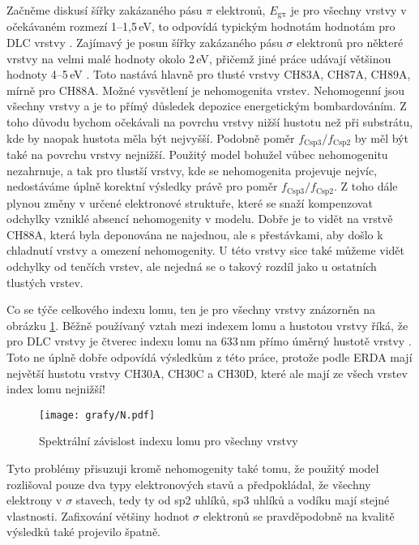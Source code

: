 Začněme diskusí šířky zakázaného pásu $\pi$ elektronů, $E_\mathrm{g\pi}$ je pro všechny vrstvy v očekávaném rozmezí 1--1,5\,eV, to odpovídá typickým hodnotám hodnotám pro DLC vrstvy \cite{Demichelis1992, Franta2007}. 
Zajímavý je posun šířky zakázaného pásu $\sigma$ elektronů pro některé vrstvy na velmi malé hodnoty okolo 2\,eV, přičemž jiné práce udávají většinou hodnoty 4--5\,eV \cite{Demichelis1992, Franta2011}. Toto nastává hlavně pro tlusté vrstvy CH83A, CH87A, CH89A, mírně pro CH88A. Možné vysvětlení je nehomogenita vrstev. Nehomogenní jsou všechny vrstvy a je to přímý důsledek depozice energetickým bombardováním. 
Z toho důvodu bychom očekávali na povrchu vrstvy nižší hustotu než při substrátu, kde by naopak hustota měla být nejvyšší. Podobně poměr $f_\mathrm{Csp3}/f_\mathrm{Csp2}$ by měl být také na povrchu vrstvy nejnižší. Použitý model bohužel vůbec nehomogenitu nezahrnuje, a tak pro tlustší vrstvy, kde se nehomogenita projevuje nejvíc, nedostáváme úplně korektní výsledky právě pro poměr $f_\mathrm{Csp3}/f_\mathrm{Csp2}$. Z toho dále plynou změny v určené elektronové struktuře, které se snaží kompenzovat odchylky vzniklé absencí nehomogenity v modelu. Dobře je to vidět na vrstvě CH88A, která byla deponována ne najednou, ale s přestávkami, aby došlo k chladnutí vrstvy a omezení nehomogenity. U této vrstvy sice také můžeme vidět odchylky od tenčích vrstev, ale nejedná se o takový rozdíl jako u ostatních tlustých vrstev.

Co se týče celkového indexu lomu, ten je pro všechny vrstvy znázorněn na obrázku \ref{index}. Běžně používaný vztah mezi indexem lomu a hustotou vrstvy říká, že pro DLC vrstvy je čtverec indexu lomu na 633\,nm přímo úměrný hustotě vrstvy \cite{Donnet2008}. Toto ne úplně dobře odpovídá výsledkům z této práce, protože podle ERDA mají největší hustotu vrstvy CH30A, CH30C a CH30D, které ale mají ze všech vrstev index lomu nejnižší!

\begin{figure}[tbhp]
	\texttt{[image: grafy/N.pdf]}
	\caption{Spektrální závislost indexu lomu pro všechny vrstvy} 
	\label{index}
\end{figure}

Tyto problémy přisuzuji kromě nehomogenity také tomu, že použitý model rozlišoval pouze dva typy elektronových stavů a předpokládal, že všechny elektrony v $\sigma$ stavech, tedy ty od sp2 uhlíků, sp3 uhlíků a vodíku mají stejné vlastnosti. Zafixování většiny hodnot $\sigma$ elektronů se pravděpodobně na kvalitě výsledků také projevilo špatně.

